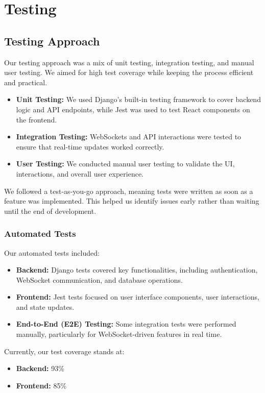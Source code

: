 \chapter{Testing}
\label{chap:testing}

\section{Testing Approach}
Our testing approach was a mix of unit testing, integration testing, and manual user testing. We aimed for high test coverage while keeping the process efficient and practical.

\begin{itemize}
    \item \textbf{Unit Testing:} We used Django’s built-in testing framework to cover backend logic and API endpoints, while Jest was used to test React components on the frontend.
    \item \textbf{Integration Testing:} WebSockets and API interactions were tested to ensure that real-time updates worked correctly.
    \item \textbf{User Testing:} We conducted manual user testing to validate the UI, interactions, and overall user experience.
\end{itemize}

We followed a test-as-you-go approach, meaning tests were written as soon as a feature was implemented. This helped us identify issues early rather than waiting until the end of development.

\subsection{Automated Tests}
Our automated tests included:

\begin{itemize}
    \item \textbf{Backend:} Django tests covered key functionalities, including authentication, WebSocket communication, and database operations.
    \item \textbf{Frontend:} Jest tests focused on user interface components, user interactions, and state updates.
    \item \textbf{End-to-End (E2E) Testing:} Some integration tests were performed manually, particularly for WebSocket-driven features in real time.
\end{itemize}

Currently, our test coverage stands at:
\begin{itemize}
    \item \textbf{Backend:} 93\%
    \item \textbf{Frontend:} 85\%
\end{itemize}


